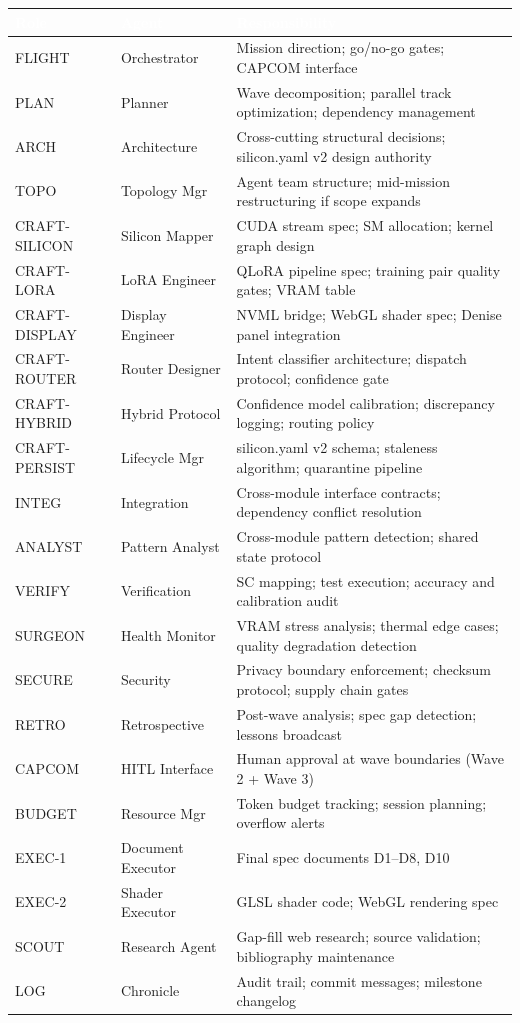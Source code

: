\documentclass[11pt,letterpaper]{article}
\newcommand{\tableheader}[1]{\textbf{\sffamily\textcolor{white}{#1}}}
\begin{document}
\begin{center}
\begin{tabularx}{\textwidth}{L{2.2cm}L{3cm}X}
\toprule
{}
\tableheader{Role} & \tableheader{Agent} & \tableheader{Responsibility} \\
\midrule
FLIGHT & Orchestrator & Mission direction; go/no-go gates; CAPCOM interface \\
PLAN & Planner & Wave decomposition; parallel track optimization; dependency management \\
ARCH & Architecture & Cross-cutting structural decisions; silicon.yaml v2 design authority \\
TOPO & Topology Mgr & Agent team structure; mid-mission restructuring if scope expands \\
CRAFT-SILICON & Silicon Mapper & CUDA stream spec; SM allocation; kernel graph design \\
CRAFT-LORA & LoRA Engineer & QLoRA pipeline spec; training pair quality gates; VRAM table \\
CRAFT-DISPLAY & Display Engineer & NVML bridge; WebGL shader spec; Denise panel integration \\
CRAFT-ROUTER & Router Designer & Intent classifier architecture; dispatch protocol; confidence gate \\
CRAFT-HYBRID & Hybrid Protocol & Confidence model calibration; discrepancy logging; routing policy \\
CRAFT-PERSIST & Lifecycle Mgr & silicon.yaml v2 schema; staleness algorithm; quarantine pipeline \\
INTEG & Integration & Cross-module interface contracts; dependency conflict resolution \\
ANALYST & Pattern Analyst & Cross-module pattern detection; shared state protocol \\
VERIFY & Verification & SC mapping; test execution; accuracy and calibration audit \\
SURGEON & Health Monitor & VRAM stress analysis; thermal edge cases; quality degradation detection \\
SECURE & Security & Privacy boundary enforcement; checksum protocol; supply chain gates \\
RETRO & Retrospective & Post-wave analysis; spec gap detection; lessons broadcast \\
CAPCOM & HITL Interface & Human approval at wave boundaries (Wave 2 + Wave 3) \\
BUDGET & Resource Mgr & Token budget tracking; session planning; overflow alerts \\
EXEC-1 & Document Executor & Final spec documents D1--D8, D10 \\
EXEC-2 & Shader Executor & GLSL shader code; WebGL rendering spec \\
SCOUT & Research Agent & Gap-fill web research; source validation; bibliography maintenance \\
LOG & Chronicle & Audit trail; commit messages; milestone changelog \\
\bottomrule
\end{tabularx}
\end{center}
\end{document}
